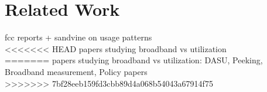 \section{Related Work}
\label{related}
fcc reports + sandvine on usage patterns\\
<<<<<<< HEAD
papers studying broadband vs utilization\\
=======
papers studying broadband vs utilization:
DASU, Peeking, Broadband measurement, Policy papers\\
>>>>>>> 7bf28eeb159fd3cbb89d4a068b54043a67914f75
